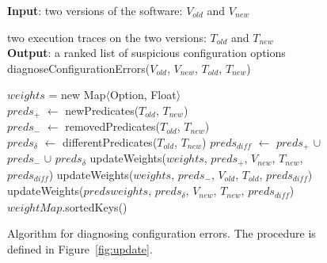 \begin{figure}[t]
\textbf{Input}: two versions of the software: $\mathit{V_{old}}$ and $V_{new}$

\quad two execution traces on the two versions: $\mathit{T_{old}}$ and $T_{new}$\\
\textbf{Output}: a ranked list of suspicious configuration options\\
\vspace{-4mm}%
diagnoseConfigurationErrors($\mathit{V_{old}}$, $\mathit{V_{new}}$, $\mathit{T_{old}}$, $\mathit{T_{new}}$)\\
\begin{algorithmic}[1]
\STATE $\mathit{weights}$ = new Map$\langle$Option, Float$\rangle$\\
\STATE $\mathit{preds_{+}}$ $\leftarrow$ newPredicates($T_{old}$, $T_{new}$)\\
\STATE $\mathit{preds_{-}}$ $\leftarrow$ removedPredicates($T_{old}$, $T_{new}$)\\
\STATE $\mathit{preds_{\delta}}$ $\leftarrow$ differentPredicates($T_{old}$, $T_{new}$)
\STATE $\mathit{preds_{diff}}$ $\leftarrow$ $\mathit{preds_{+}}$ $\cup$ $\mathit{preds_{-}}$ $\cup$ $\mathit{preds_{\delta}}$
\STATE updateWeights($\mathit{weights}$, $\mathit{preds_{+}}$, $\mathit{V_{new}}$, $\mathit{T_{new}}$, $\mathit{preds_{diff}}$)
\STATE updateWeights($\mathit{weights}$, $\mathit{preds_{-}}$, $\mathit{V_{old}}$, $\mathit{T_{old}}$, $\mathit{preds_{diff}}$)
\STATE updateWeights($\mathit{predsweights}$, $\mathit{preds_{\delta}}$, $\mathit{V_{new}}$, $\mathit{T_{new}}$, $\mathit{preds_{diff}}$)
\RETURN $\mathit{weightMap}$.sortedKeys()
\end{algorithmic}
\caption{Algorithm for diagnosing configuration errors. The
procedure  is defined in Figure~\ref{fig:update}.
\label{fig:diagalg}
}
\end{figure}


